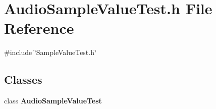 \section{Audio\+Sample\+Value\+Test.\+h File Reference}
\label{AudioSampleValueTest_8h}
{\ttfamily \#include \char`\"{}Sample\+Value\+Test.\+h\char`\"{}}\newline
\subsection*{Classes}
\begin{DoxyCompactItemize}
\item 
class \textbf{ Audio\+Sample\+Value\+Test}
\end{DoxyCompactItemize}
